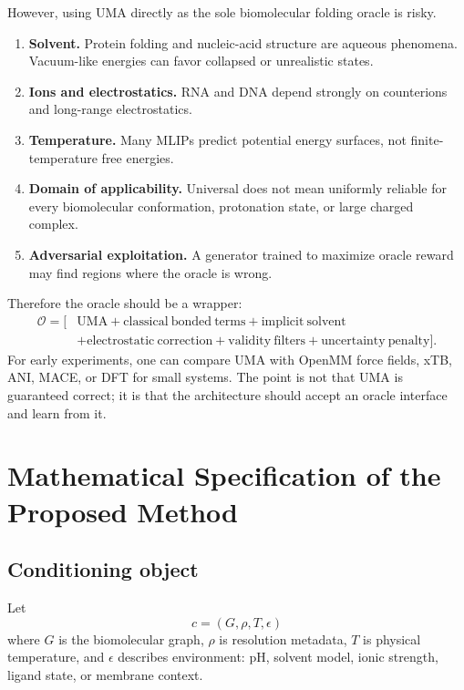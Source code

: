\documentclass[11pt]{article}
\newcommand{\oracle}{\mathcal{O}}
\begin{document}
However, using UMA directly as the sole biomolecular folding oracle is risky.

\begin{enumerate}[leftmargin=2em]
  \item \textbf{Solvent.} Protein folding and nucleic-acid structure are aqueous phenomena. Vacuum-like energies can favor collapsed or unrealistic states.
  \item \textbf{Ions and electrostatics.} RNA and DNA depend strongly on counterions and long-range electrostatics.
  \item \textbf{Temperature.} Many MLIPs predict potential energy surfaces, not finite-temperature free energies.
  \item \textbf{Domain of applicability.} Universal does not mean uniformly reliable for every biomolecular conformation, protonation state, or large charged complex.
  \item \textbf{Adversarial exploitation.} A generator trained to maximize oracle reward may find regions where the oracle is wrong.
\end{enumerate}

Therefore the oracle should be a wrapper:
\[
\begin{aligned}
\oracle = \big[&
\mathrm{UMA}
+ \mathrm{classical\ bonded\ terms}
+ \mathrm{implicit\ solvent}\\
&+ \mathrm{electrostatic\ correction}
+ \mathrm{validity\ filters}
+ \mathrm{uncertainty\ penalty}
\big].
\end{aligned}
\]
For early experiments, one can compare UMA with OpenMM force fields, xTB, ANI, MACE, or DFT for small systems. The point is not that UMA is guaranteed correct; it is that the architecture should accept an oracle interface and learn from it.

\section{Mathematical Specification of the Proposed Method}

\subsection{Conditioning object}

Let
\[
c=(G,\rho,T,\epsilon)
\]
where $G$ is the biomolecular graph, $\rho$ is resolution metadata, $T$ is physical temperature, and $\epsilon$ describes environment: pH, solvent model, ionic strength, ligand state, or membrane context.
\end{document}
